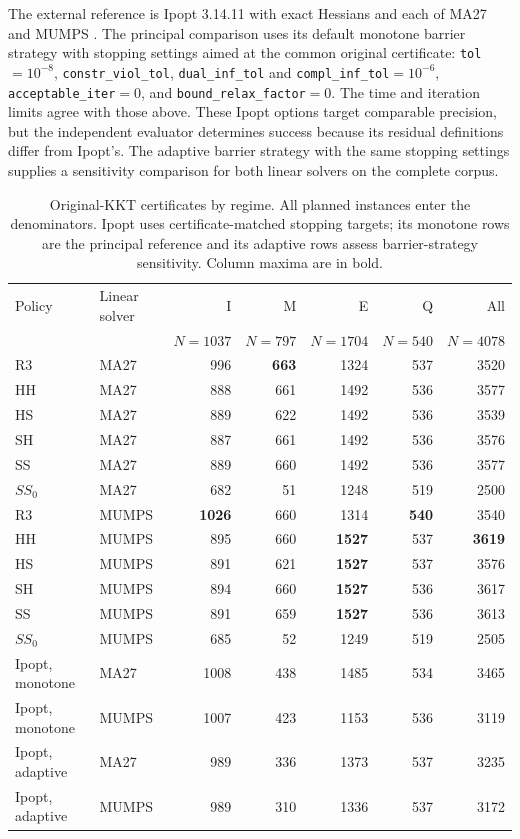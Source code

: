 \documentclass[pdflatex,sn-mathphys-num]{sn-jnl}
\theoremstyle{thmstyleone}
\theoremstyle{thmstylethree}
\begin{document}
The external reference is Ipopt 3.14.11 with exact Hessians and each of
MA27 and MUMPS \citep{WachterBiegler2006,IpoptOptions2026}. The principal
comparison uses its default monotone barrier strategy with stopping
settings aimed at the common original certificate: \texttt{tol}$=10^{-8}$,
\texttt{constr\_viol\_tol}, \texttt{dual\_inf\_tol} and
\texttt{compl\_inf\_tol}$=10^{-6}$, \texttt{acceptable\_iter}$=0$, and
\texttt{bound\_relax\_factor}$=0$. The time and iteration limits agree
with those above. These Ipopt options target comparable precision, but the independent
evaluator determines success because its residual definitions differ
from Ipopt's. The adaptive barrier strategy
with the same stopping settings supplies a sensitivity comparison for
both linear solvers on the complete corpus.

\begin{table}[t]
\centering\small
\caption{Original-KKT certificates by regime. All planned instances enter
the denominators. Ipopt uses certificate-matched stopping targets; its
monotone rows are the principal reference and its adaptive rows assess
barrier-strategy sensitivity. Column maxima are in bold.}
\label{tab:mega-regimes}
\setlength{\tabcolsep}{4pt}
\begin{tabular}{@{}llrrrrr@{}}
\toprule
Policy & Linear solver & I & M & E & Q & All\\
& & $N=1037$ & $N=797$ & $N=1704$ & $N=540$ & $N=4078$\\
\midrule
R3 & MA27 &996&\textbf{663}&1324&537&3520\\
HH & MA27 &888&661&1492&536&3577\\
HS & MA27 &889&622&1492&536&3539\\
SH & MA27 &887&661&1492&536&3576\\
SS & MA27 &889&660&1492&536&3577\\
$SS_0$ & MA27 &682&51&1248&519&2500\\
\addlinespace
R3 & MUMPS &\textbf{1026}&660&1314&\textbf{540}&3540\\
HH & MUMPS &895&660&\textbf{1527}&537&\textbf{3619}\\
HS & MUMPS &891&621&\textbf{1527}&537&3576\\
SH & MUMPS &894&660&\textbf{1527}&536&3617\\
SS & MUMPS &891&659&\textbf{1527}&536&3613\\
$SS_0$ & MUMPS &685&52&1249&519&2505\\
\midrule
Ipopt, monotone & MA27 &1008&438&1485&534&3465\\
Ipopt, monotone & MUMPS &1007&423&1153&536&3119\\
Ipopt, adaptive & MA27 &989&336&1373&537&3235\\
Ipopt, adaptive & MUMPS &989&310&1336&537&3172\\
\bottomrule
\end{tabular}
\end{table}
\end{document}
